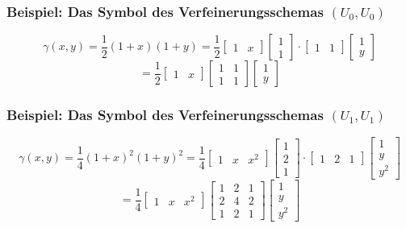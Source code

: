 \subsubsection{Beispiel: Das Symbol des Verfeinerungsschemas \((U_0,U_0)\)}
\[\gamma(x,y) = \frac{1}{2} (1+x)(1+y) = \frac{1}{2}
	\begin{bmatrix} 1 & x\end{bmatrix}
	\begin{bmatrix} 1 \\ 1 \end{bmatrix}
	\cdot \begin{bmatrix} 1 & 1 \end{bmatrix}
	\begin{bmatrix} 1 \\ y \end{bmatrix}
\]
\[	= \frac{1}{2}
	\begin{bmatrix} 1 & x \end{bmatrix}
	\begin{bmatrix} 1 & 1 \\ 1 & 1 \end{bmatrix}
	\begin{bmatrix} 1 \\ y \end{bmatrix}\]

\subsubsection{Beispiel: Das Symbol des Verfeinerungsschemas \((U_1,U_1)\)}
\[\gamma(x,y) = \frac{1}{4} (1+x)^2(1+y)^2 = \frac{1}{4}
	\begin{bmatrix} 1 & x & x^2 \end{bmatrix}
	\begin{bmatrix} 1 \\ 2 \\ 1 \end{bmatrix}
	\cdot \begin{bmatrix} 1 & 2 & 1 \end{bmatrix}
	\begin{bmatrix} 1 \\ y \\ y^2 \end{bmatrix}
\]
\[	= \frac{1}{4}
	\begin{bmatrix} 1 & x & x^2 \end{bmatrix}
	\begin{bmatrix} 1 & 2 & 1 \\ 2 & 4 & 2 \\ 1 & 2 & 1 \end{bmatrix}
	\begin{bmatrix} 1 \\ y \\ y^2 \end{bmatrix}\]

